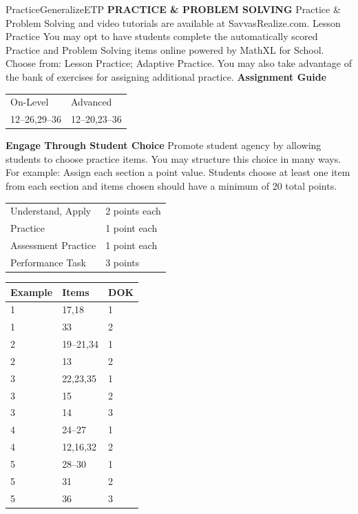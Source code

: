 \documentclass{article}
\newenvironment{item-analysis}{}{}      %
\newenvironment{te-addendum}[2]{}{}     %
\newcommand{\te}[1]{}                   %
\begin{document}
\begin{te-addendum}{Practice}{GeneralizeETP}
\textbf{PRACTICE \& PROBLEM SOLVING}
Practice \& Problem Solving and video tutorials are available at SavvasRealize.com.
Lesson Practice You may opt to have students complete the automatically scored Practice and Problem Solving items online powered by MathXL for School.
Choose from: Lesson Practice; Adaptive Practice.
You may also take advantage of the bank of exercises for assigning additional practice.
\textbf{Assignment Guide}
\begin{tabular}{ll}
On-Level & Advanced \\
12--26,29--36 & 12--20,23--36 \\
\end{tabular}
\textbf{Engage Through Student Choice}
Promote student agency by allowing students to choose practice items. You may structure this choice in many ways.
For example:
Assign each section a point value. Students choose at least one item from each section and items chosen should have a minimum of 20 total points.
\begin{tabular}{ll}
Understand, Apply & 2 points each \\
Practice & 1 point each \\
Assessment Practice & 1 point each \\
Performance Task & 3 points \\
\end{tabular}
\te{Scan the QR code to access a video tutorial. 12--13. Answers on previous page. See answers for Exercises 15--18 and 24--27 on next page.}
\end{te-addendum}
\begin{item-analysis}
\begin{tabular}{lll}
\toprule
Example & Items & DOK \\
\midrule
1 & 17,18 & 1 \\
1 & 33 & 2 \\
2 & 19--21,34 & 1 \\
2 & 13 & 2 \\
3 & 22,23,35 & 1 \\
3 & 15 & 2 \\
3 & 14 & 3 \\
4 & 24--27 & 1 \\
4 & 12,16,32 & 2 \\
5 & 28--30 & 1 \\
5 & 31 & 2 \\
5 & 36 & 3 \\
\bottomrule
\end{tabular}
\end{item-analysis}
\end{document}
